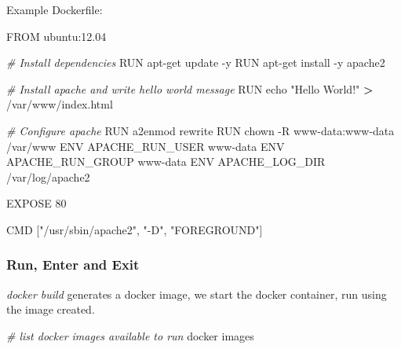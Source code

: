 \documentclass[
]{book}
\newenvironment{Shaded}{\begin{snugshade}}{\end{snugshade}}
\newcommand{\CommentTok}[1]{\textcolor[rgb]{0.56,0.35,0.01}{\textit{#1}}}
\newcommand{\ExtensionTok}[1]{#1}
\newcommand{\NormalTok}[1]{#1}
\newcommand{\OperatorTok}[1]{\textcolor[rgb]{0.81,0.36,0.00}{\textbf{#1}}}
\newcommand{\StringTok}[1]{\textcolor[rgb]{0.31,0.60,0.02}{#1}}
\begin{document}
Example Dockerfile:

\begin{Shaded}
\begin{Highlighting}[]
\ExtensionTok{FROM}\NormalTok{ ubuntu:12.04}

\CommentTok{# Install dependencies}
\ExtensionTok{RUN}\NormalTok{ apt-get update -y}
\ExtensionTok{RUN}\NormalTok{ apt-get install -y apache2}

\CommentTok{# Install apache and write hello world message}
\ExtensionTok{RUN}\NormalTok{ echo }\StringTok{"Hello World!"} \OperatorTok{>}\NormalTok{ /var/www/index.html}

\CommentTok{# Configure apache}
\ExtensionTok{RUN}\NormalTok{ a2enmod rewrite}
\ExtensionTok{RUN}\NormalTok{ chown -R www-data:www-data /var/www}
\ExtensionTok{ENV}\NormalTok{ APACHE_RUN_USER www-data}
\ExtensionTok{ENV}\NormalTok{ APACHE_RUN_GROUP www-data}
\ExtensionTok{ENV}\NormalTok{ APACHE_LOG_DIR /var/log/apache2}

\ExtensionTok{EXPOSE}\NormalTok{ 80}

\ExtensionTok{CMD}\NormalTok{ [}\StringTok{"/usr/sbin/apache2"}\NormalTok{, }\StringTok{"-D"}\NormalTok{,  }\StringTok{"FOREGROUND"}\NormalTok{]}
\end{Highlighting}
\end{Shaded}

\hypertarget{run-enter-and-exit}{%
\subsubsection{Run, Enter and Exit}\label{run-enter-and-exit}}

\emph{docker build} generates a docker image, we start the docker container, run using the image created.

\begin{Shaded}
\begin{Highlighting}[]
\CommentTok{# list docker images available to run}
\ExtensionTok{docker}\NormalTok{ images}
\end{Highlighting}
\end{Shaded}
\end{document}
